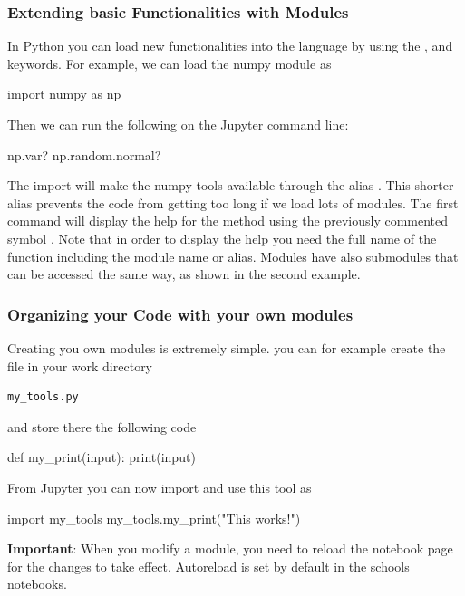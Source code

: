 \subsubsection{Extending basic Functionalities with Modules}

In Python you can load new functionalities into the language by using the
,  and  keywords. For example, we can load the
numpy module as

\begin{python}
import numpy as np
\end{python}

\noindent Then we can run the following on the Jupyter command line:

\begin{python}
np.var?
np.random.normal?
\end{python}

The import will make the numpy tools available through the alias .  This shorter alias prevents the code from getting too long if we load lots of modules. The first command will display the help for the method  using the previously commented symbol . Note that in order to display the help you need the full name of the function including the module name or alias. Modules have also submodules that can be accessed the same way, as shown in the second example.

\subsubsection{Organizing your Code with your own modules}

Creating you own modules is extremely simple. you can for example create the
file in your work directory

\begin{verbatim}
my_tools.py
\end{verbatim}

\noindent and store there the following code 

\begin{python}
def my_print(input):
    print(input)
\end{python}

From Jupyter you can now import and use this tool as

\begin{python}
import my_tools
my_tools.my_print("This works!") 
\end{python}

\textbf{Important}: When you modify a module, you need to reload the notebook page for the changes to take effect. Autoreload is set by default in the schools notebooks.

